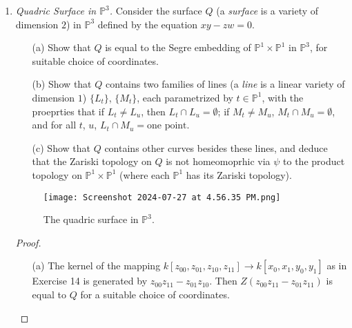 \documentclass[12pt]{article}
\newcommand{\PP}{\mathbb{P}}
\theoremstyle{definition}
\begin{document}
\begin{enumerate} [label=\textbf{\arabic*.}, leftmargin=-0.05em]
\item \textit{Quadric Surface in $\PP^3$.} Consider the surface $Q$ (a \textit{surface} is a variety of dimension $2$) in $\PP^3$ defined by the equation $xy - zw = 0$. 
\begin{itemize}
    \item[(a)] Show that $Q$ is equal to the Segre embedding of $\PP^1 \times \PP^1$ in $\PP^3$, for suitable choice of coordinates.
    \item[(b)] Show that $Q$ contains two families of lines (a \textit{line} is a linear variety of dimension $1$) $\{ L_t \}$, $\{ M_t \}$, each parametrized by $t \in \PP^1$, with the proeprties that if $L_t \neq L_u$, then $L_t \cap L_u = \emptyset$; if $M_t \neq M_u$, $M_t \cap M_u = \emptyset$, and for all $t$, $u$, $L_t \cap M_u = \text{one point}$.
    \item[(c)] Show that $Q$ contains other curves besides these lines, and deduce that the Zariski topology on $Q$ is not homeomoprhic via $\psi$ to the product topology on $\PP^1 \times \PP^1$ (where each $\PP^1$ has its Zariski topology).
\end{itemize}
\begin{figure}[H]
    \centering
    \texttt{[image: Screenshot 2024-07-27 at 4.56.35 PM.png]}
    \caption{The quadric surface in $\PP^3$.}
\end{figure}

\begin{proof} $ $ \vspace{0pt}
    \begin{itemize}
        \item[(a)] The kernel of the mapping $k[z_{00}, z_{01}, z_{10}, z_{11}] \to k[x_0, x_1, y_0, y_1]$ as in Exercise 14 is generated by $z_{00} z_{11} - z_{01} z_{10}$. Then $Z(z_{00} z_{11} - z_{01} z_{11})$ is equal to $Q$ for a suitable choice of coordinates.


\end{itemize}
\end{proof}
\end{enumerate}
\end{document}
